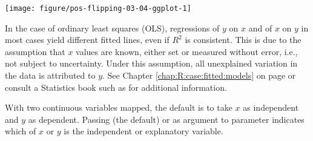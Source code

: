 \documentclass[krantz2]{krantz}\usepackage{knitr}
\begin{document}
\begin{knitrout}\footnotesize
{}\color{fgcolor}\begin{kframe}
\begin{alltt}
 \hlkwb{<-}
  \hlstd{(} 
          \hlstd{=} \hlstd{(}    \hlopt{+}
  \hlstd{(} \hlstd{=} \hlstd{,}  \hlstd{=} \hlstd{)}
\end{alltt}
\end{kframe}
\end{knitrout}

\begin{knitrout}\footnotesize
{}\color{fgcolor}\begin{kframe}
\begin{alltt}
 \hlopt{+} 
\end{alltt}
\end{kframe}

{\centering \texttt{[image: figure/pos-flipping-03-04-ggplot-1]} 

}


\end{knitrout}



\begin{explainbox}
In the case of ordinary least squares (OLS), regressions of $y$ on $x$ and of $x$ on $y$ in most cases yield different fitted lines, even if $R^2$ is consistent. This is due to the assumption that $x$ values are known, either set or measured without error, i.e., not subject to uncertainty. Under this assumption, all unexplained variation in the data is attributed to $y$. See Chapter \ref{chap:R:case:fitted:models} on page \pageref{chap:R:case:fitted:models} or consult a Statistics book such as  \autocite[][pp.\ 168--170]{Holmes2019} for additional information.
\end{explainbox}

With two continuous variables mapped, the default is to take $x$ as independent and $y$ as dependent. Passing  (the default) or  as argument to parameter  indicates which of $x$ or $y$ is the independent or explanatory variable.



\begin{knitrout}\footnotesize
{}\color{fgcolor}\begin{kframe}
\begin{alltt}
 \hlkwb{<-}
  \hlstd{(} 
        \hlstd{=} \hlstd{(}    \hlopt{+}
  \hlstd{()} \hlopt{+}
  \hlstd{(}\hlopt{~}  \hlstd{=} \hlstd{)}
\end{alltt}
\end{kframe}
\end{knitrout}
\end{document}
